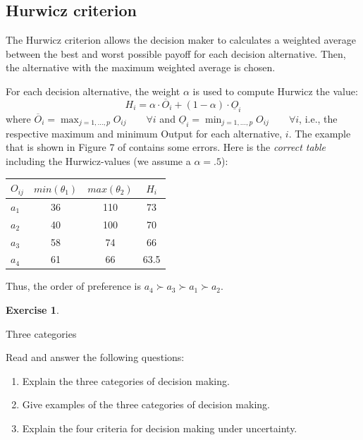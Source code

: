 \documentclass[
  12pt,
  oneside]{book}
\providecommand{\tightlist}{%
  \setlength{\itemsep}{0pt}\setlength{\parskip}{0pt}}
\theoremstyle{definition}
\theoremstyle{definition}
\theoremstyle{definition}
\newtheorem{exercise}{Exercise}[chapter]
\theoremstyle{definition}
\theoremstyle{remark}
\begin{document}
\subsection*{Hurwicz criterion}\label{hurwicz-criterion}

The Hurwicz criterion allows the decision maker to calculates a weighted average between the best and worst possible payoff for each decision alternative. Then, the alternative with the maximum weighted average is chosen.

For each decision alternative, the weight \(\alpha\) is used to compute Hurwicz the value:
\[H_i=\alpha \cdot \overline{O}_i + (1-\alpha)\cdot \underline{O}_i\]
where \(\overline{O}_i=\max_{j=1,\dots,p}{O_{ij}}\qquad \forall i\) and \(\underline{O}_i=\min_{j=1,\dots,p}{O_{ij}}\qquad \forall i\), i.e., the respective maximum and minimum Output for each alternative, \(i\).
The example that is shown in Figure 7 of \citet[p.401]{Finne1998three} contains some errors. Here is the \emph{correct table} including the Hurwicz-values (we assume a \(\alpha=.5\)):

\begin{longtable}[]{@{}lccc@{}}
\toprule\noalign{}
\(O_{ij}\) & \(min(\theta_1)\) & \(max(\theta_2)\) & \(H_i\) \\
\midrule\noalign{}
\endhead
\bottomrule\noalign{}
\endlastfoot
\(a_1\) & 36 & 110 & 73 \\
\(a_2\) & 40 & 100 & 70 \\
\(a_3\) & 58 & 74 & 66 \\
\(a_4\) & 61 & 66 & 63.5 \\
\end{longtable}

Thus, the order of preference is \(a_4\succ a_3 \succ a_1 \succ a_2\).

\begin{exercise}
\protect\hypertarget{exr:finne}{}\label{exr:finne}

Three categories

Read \citet{Finne1998three} and answer the following questions:

\begin{enumerate}
\def\labelenumi{\alph{enumi})}
\tightlist
\item
  Explain the three categories of decision making.
\item
  Give examples of the three categories of decision making.
\item
  Explain the four criteria for decision making under uncertainty.
\end{enumerate}

\end{exercise}
\end{document}
